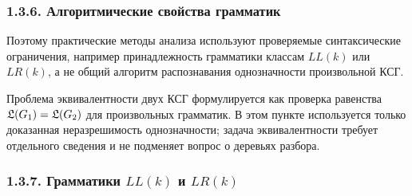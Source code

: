 \documentclass[mathserif,12pt,aspectratio=169]{beamer}
\begin{document}
\begin{frame}
	\frametitle{1.3.6. Алгоритмические свойства грамматик }
	\setlength{\parskip}{1pt}
	\sloppy
	
	\begin{remark}
		Поэтому практические методы анализа используют проверяемые синтаксические ограничения, например принадлежность грамматики классам $LL(k)$ или $LR(k)$, а не общий алгоритм распознавания однозначности произвольной КСГ.
	\end{remark}
	
	\begin{digress}
		Проблема эквивалентности двух КСГ формулируется как проверка равенства $\frak{L}(G_1)=\frak{L}(G_2)$ для произвольных грамматик. В этом пункте используется только доказанная неразрешимость однозначности; задача эквивалентности требует отдельного сведения и не подменяет вопрос о деревьях разбора.
	\end{digress}
	
\end{frame}

\subsubsection{1.3.7. Грамматики $LL(k)$ и $LR(k)$ }\label{1.3.7.}
\end{document}
